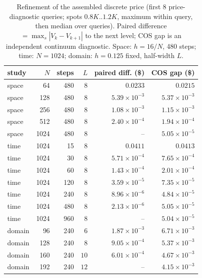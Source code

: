\begin{table}[!htbp]
\centering\small
\caption{Refinement of the assembled discrete price (first 8 price-diagnostic queries; spots $0.8K..1.2K$, maximum within query, then median over queries). Paired difference $=\max_s|V_k-V_{k+1}|$ to the next level; COS gap is an independent continuum diagnostic. Space: $h=16/N$, 480 steps; time: $N=1024$; domain: $h=0.125$ fixed, half-width $L$.}
\label{tab:refinement}
\begin{tabular}{lrrrrr}
\toprule
study & $N$ & steps & $L$ & paired diff. (\$) & COS gap (\$)\\
\midrule
space & 64 & 480 & $8$ & $0.0233$ & $0.0215$\\
space & 128 & 480 & $8$ & $5.39\times10^{-3}$ & $5.37\times10^{-3}$\\
space & 256 & 480 & $8$ & $1.08\times10^{-3}$ & $1.15\times10^{-3}$\\
space & 512 & 480 & $8$ & $2.40\times10^{-4}$ & $1.94\times10^{-4}$\\
space & 1024 & 480 & $8$ & -- & $5.05\times10^{-5}$\\
time & 1024 & 15 & $8$ & $0.0411$ & $0.0413$\\
time & 1024 & 30 & $8$ & $5.71\times10^{-4}$ & $7.65\times10^{-4}$\\
time & 1024 & 60 & $8$ & $1.43\times10^{-4}$ & $2.01\times10^{-4}$\\
time & 1024 & 120 & $8$ & $3.59\times10^{-5}$ & $7.35\times10^{-5}$\\
time & 1024 & 240 & $8$ & $8.96\times10^{-6}$ & $4.84\times10^{-5}$\\
time & 1024 & 480 & $8$ & $2.13\times10^{-6}$ & $5.05\times10^{-5}$\\
time & 1024 & 960 & $8$ & -- & $5.04\times10^{-5}$\\
domain & 96 & 240 & $6$ & $1.87\times10^{-3}$ & $6.71\times10^{-3}$\\
domain & 128 & 240 & $8$ & $9.05\times10^{-4}$ & $5.37\times10^{-3}$\\
domain & 160 & 240 & $10$ & $6.01\times10^{-4}$ & $4.67\times10^{-3}$\\
domain & 192 & 240 & $12$ & -- & $4.15\times10^{-3}$\\
\bottomrule
\end{tabular}
\end{table}
